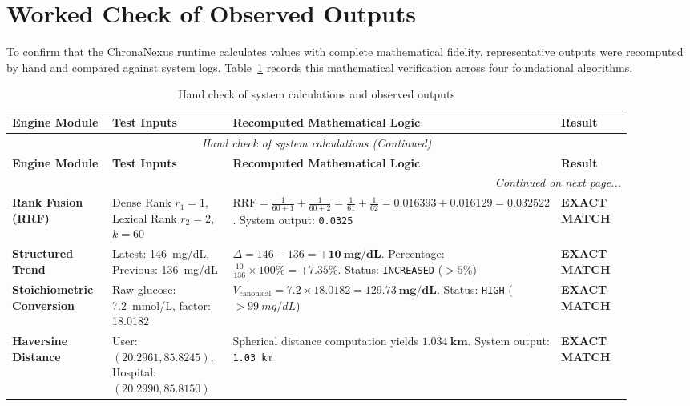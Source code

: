 \section{Worked Check of Observed Outputs}
\label{sec:worked_check}

To confirm that the ChronaNexus runtime calculates values with complete mathematical fidelity, representative outputs were recomputed by hand and compared against system logs. Table~\ref{tab:9_4_handcheck} records this mathematical verification across four foundational algorithms.

\small
\begin{longtable}{@{}p{0.18\linewidth} p{0.22\linewidth} p{0.36\linewidth} p{0.14\linewidth}@{}}
\caption{Hand check of system calculations and observed outputs}\label{tab:9_4_handcheck} \\
\toprule
\textbf{Engine Module} & \textbf{Test Inputs} & \textbf{Recomputed Mathematical Logic} & \textbf{Result} \\
\midrule
\endfirsthead
\toprule
\multicolumn{4}{c}{\small\textit{Hand check of system calculations (Continued)}} \\[4pt]
\midrule
\textbf{Engine Module} & \textbf{Test Inputs} & \textbf{Recomputed Mathematical Logic} & \textbf{Result} \\
\midrule
\endhead
\midrule
\multicolumn{4}{r}{\footnotesize\textit{Continued on next page...}} \\
\bottomrule
\endfoot
\bottomrule
\endlastfoot
\textbf{Rank Fusion (RRF)} & Dense Rank $r_1=1$, Lexical Rank $r_2=2$, $k=60$ & $\text{RRF} = \frac{1}{60+1} + \frac{1}{60+2} = \frac{1}{61} + \frac{1}{62} = 0.016393 + 0.016129 = \mathbf{0.032522}$. System output: \texttt{0.0325} & \textbf{EXACT MATCH} \\
\textbf{Structured Trend} & Latest: 146~mg/dL, Previous: 136~mg/dL & $\Delta = 146 - 136 = \mathbf{+10~mg/dL}$. Percentage: $\frac{10}{136} \times 100\% = \mathbf{+7.35\%}$. Status: \texttt{INCREASED} ($>5\%$) & \textbf{EXACT MATCH} \\
\textbf{Stoichiometric Conversion} & Raw glucose: 7.2~mmol/L, factor: 18.0182 & $V_{\text{canonical}} = 7.2 \times 18.0182 = \mathbf{129.73~mg/dL}$. Status: \texttt{HIGH} ($>99~mg/dL$) & \textbf{EXACT MATCH} \\
\textbf{Haversine Distance} & User: $(20.2961, 85.8245)$, Hospital: $(20.2990, 85.8150)$ & Spherical distance computation yields $\mathbf{1.034~km}$. System output: \texttt{1.03 km} & \textbf{EXACT MATCH} \\
\bottomrule
\end{longtable}
\normalsize



